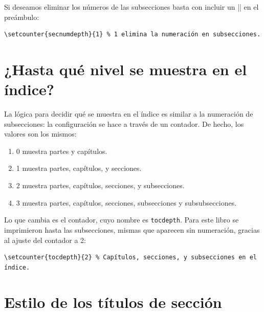 Si deseamos eliminar los números de las subsecciones basta con incluir un |\setcounter| en el preámbulo:

\begin{lstlisting}[style=latex]
\setcounter{secnumdepth}{1} % 1 elimina la numeración en subsecciones.
\end{lstlisting}



\section{¿Hasta qué nivel se muestra en el índice?}
\label{sec:nivel_indice}



La lógica para decidir qué se muestra en el índice es similar a la numeración de subsecciones: la configuración se hace a través de un contador. De hecho, los valores son los mismos:
\begin{enumerate}[nosep]
	\item 0 muestra partes y capítulos.
	\item 1 muestra partes, capítulos, y secciones.
	\item 2 muestra partes, capítulos, secciones, y subsecciones.
	\item 3 muestra partes, capítulos, secciones, subsecciones y subsubsecciones.
\end{enumerate}

Lo que cambia es el contador, cuyo nombre es \texttt{tocdepth}. Para este libro se imprimieron hasta las subsecciones, mismas que aparecen sin numeración, gracias al ajuste del contador a 2:

\begin{lstlisting}[style=latex]
\setcounter{tocdepth}{2} % Capítulos, secciones, y subsecciones en el índice.
\end{lstlisting}



\section{Estilo de los títulos de sección}
\label{sec:estilo_de_los_titulos_de_seccion}




